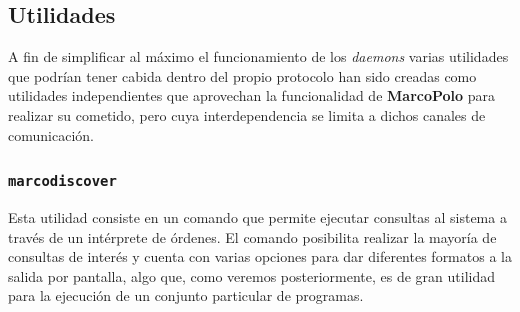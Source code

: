 






 
\subsection{Utilidades}

A fin de simplificar al máximo el funcionamiento de los \textit{daemons} varias utilidades que podrían tener cabida dentro del propio protocolo han sido creadas como utilidades independientes que aprovechan la funcionalidad de \textbf{MarcoPolo} para realizar su cometido, pero cuya interdependencia se limita a dichos canales de comunicación.

\subsubsection{\texttt{marcodiscover}}
\label{marcodiscover}
Esta utilidad consiste en un comando que permite ejecutar consultas al sistema a través de un intérprete de órdenes. El comando posibilita realizar la mayoría de consultas de interés y cuenta con varias opciones para dar diferentes formatos a la salida por pantalla, algo que, como veremos posteriormente, es de gran utilidad para la ejecución de un conjunto particular de programas.

